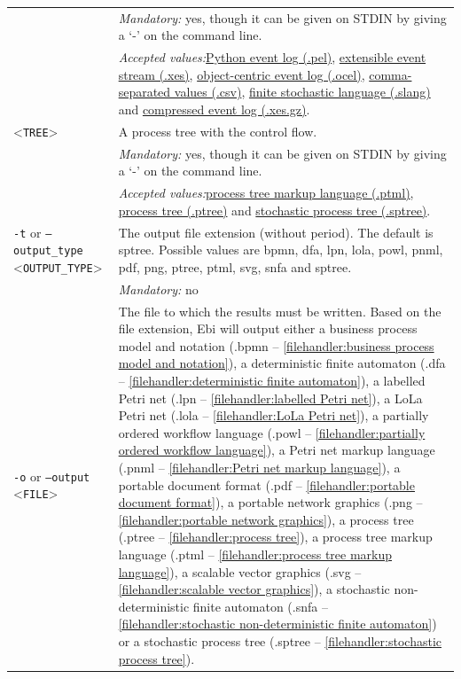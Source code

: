 {\begin{tabularx}{\linewidth}{lX}
&\textit{Mandatory:} \quad yes, though it can be given on STDIN by giving a `-' on the command line.\\
&\textit{Accepted values:}\quad \hyperref[filehandler:Python event log]{Python event log (.pel)}, \hyperref[filehandler:extensible event stream]{extensible event stream (.xes)}, \hyperref[filehandler:object-centric event log]{object-centric event log (.ocel)}, \hyperref[filehandler:comma-separated values]{comma-separated values (.csv)}, \hyperref[filehandler:finite stochastic language]{finite stochastic language (.slang)} and \hyperref[filehandler:compressed event log]{compressed event log (.xes.gz)}.\\
<\texttt{TREE}>&A process tree with the control flow.\\
&\textit{Mandatory:} \quad yes, though it can be given on STDIN by giving a `-' on the command line.\\
&\textit{Accepted values:}\quad \hyperref[filehandler:process tree markup language]{process tree markup language (.ptml)}, \hyperref[filehandler:process tree]{process tree (.ptree)} and \hyperref[filehandler:stochastic process tree]{stochastic process tree (.sptree)}.\\
\texttt{-t} or \texttt{--output\_type} <\texttt{OUTPUT\_TYPE}> &
The output file extension (without period). The default is sptree. Possible values are bpmn, dfa, lpn, lola, powl, pnml, pdf, png, ptree, ptml, svg, snfa and sptree.\\
&\textit{Mandatory:} \quad no\\
\texttt{-o} or \texttt{--output} <\texttt{FILE}> &
The file to which the results must be written. Based on the file extension, Ebi will output either a business process model and notation (.bpmn -- \cref{filehandler:business process model and notation}), a deterministic finite automaton (.dfa -- \cref{filehandler:deterministic finite automaton}), a labelled Petri net (.lpn -- \cref{filehandler:labelled Petri net}), a LoLa Petri net (.lola -- \cref{filehandler:LoLa Petri net}), a partially ordered workflow language (.powl -- \cref{filehandler:partially ordered workflow language}), a Petri net markup language (.pnml -- \cref{filehandler:Petri net markup language}), a portable document format (.pdf -- \cref{filehandler:portable document format}), a portable network graphics (.png -- \cref{filehandler:portable network graphics}), a process tree (.ptree -- \cref{filehandler:process tree}), a process tree markup language (.ptml -- \cref{filehandler:process tree markup language}), a scalable vector graphics (.svg -- \cref{filehandler:scalable vector graphics}), a stochastic non-deterministic finite automaton (.snfa -- \cref{filehandler:stochastic non-deterministic finite automaton}) or a stochastic process tree (.sptree -- \cref{filehandler:stochastic process tree}).

\end{tabularx}}
